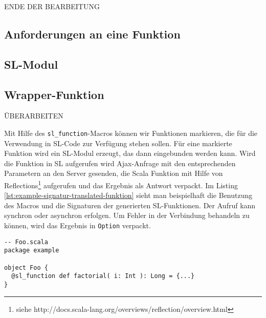 \documentclass[12pt]{scrreprt}
\begin{document}
ENDE DER BEARBEITUNG

\subsection{Anforderungen an eine Funktion}


\subsection{SL-Modul}

\subsection{Wrapper-Funktion}

ÜBERARBEITEN

Mit Hilfe des \lstinline!sl_function!-Macros können wir Funktionen markieren, die für die Verwendung in \ac{SL}-Code zur Verfügung stehen sollen. Für eine markierte Funktion wird ein \ac{SL}-Modul erzeugt, das dann eingebunden werden kann. Wird die Funktion in SL aufgerufen wird Ajax-Anfrage mit den entsprechenden Parametern an den Server gesenden, die Scala Funktion mit Hilfe von Reflections\footnote{siehe http://docs.scala-lang.org/overviews/reflection/overview.html} aufgerufen und das Ergebnis als Antwort verpackt. Im Listing \ref{lst:example-signatur-translated-funktion} sieht man beispielhaft die Benutzung des Macros und die Signaturen der generierten SL-Funktionen. Der Aufruf kann synchron oder asynchron erfolgen. Um Fehler in der Verbindung behandeln zu können, wird das Ergebnis in \lstinline!Option! verpackt.

\begin{lstlisting}[caption=Scala Beispielfunktion, label=lst:example-signatur-translated-funktion, float]
-- Foo.scala
package example

object Foo {
  @sl_function def factorial( i: Int ): Long = {...}
}
\end{lstlisting}
\end{document}
